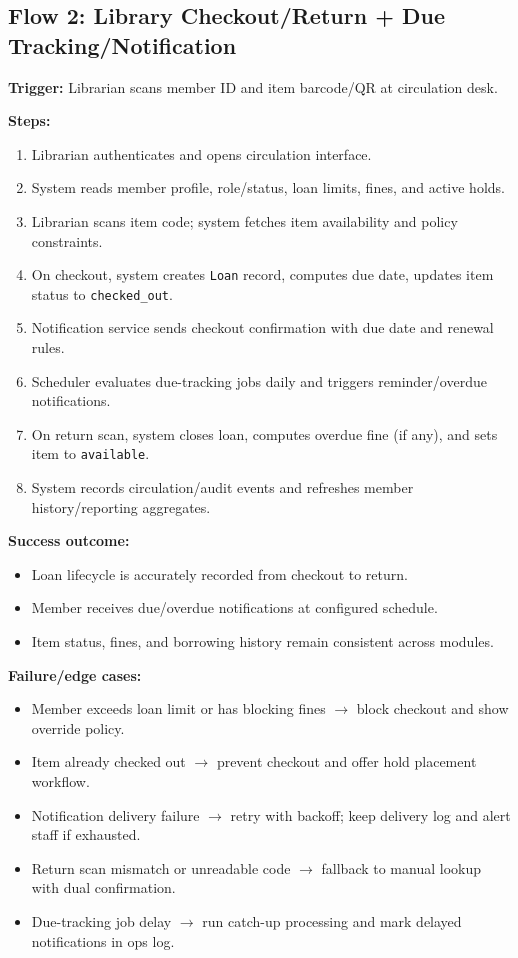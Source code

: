 \documentclass[12pt,a4paper]{article}
\begin{document}
\subsection*{Flow 2: Library Checkout/Return + Due Tracking/Notification}
\textbf{Trigger:} Librarian scans member ID and item barcode/QR at circulation desk.

\textbf{Steps:}
\begin{enumerate}
    \item Librarian authenticates and opens circulation interface.
    \item System reads member profile, role/status, loan limits, fines, and active holds.
    \item Librarian scans item code; system fetches item availability and policy constraints.
    \item On checkout, system creates \texttt{Loan} record, computes due date, updates item status to \texttt{checked\_out}.
    \item Notification service sends checkout confirmation with due date and renewal rules.
    \item Scheduler evaluates due-tracking jobs daily and triggers reminder/overdue notifications.
    \item On return scan, system closes loan, computes overdue fine (if any), and sets item to \texttt{available}.
    \item System records circulation/audit events and refreshes member history/reporting aggregates.
\end{enumerate}

\textbf{Success outcome:}
\begin{itemize}
    \item Loan lifecycle is accurately recorded from checkout to return.
    \item Member receives due/overdue notifications at configured schedule.
    \item Item status, fines, and borrowing history remain consistent across modules.
\end{itemize}

\textbf{Failure/edge cases:}
\begin{itemize}
    \item Member exceeds loan limit or has blocking fines $\rightarrow$ block checkout and show override policy.
    \item Item already checked out $\rightarrow$ prevent checkout and offer hold placement workflow.
    \item Notification delivery failure $\rightarrow$ retry with backoff; keep delivery log and alert staff if exhausted.
    \item Return scan mismatch or unreadable code $\rightarrow$ fallback to manual lookup with dual confirmation.
    \item Due-tracking job delay $\rightarrow$ run catch-up processing and mark delayed notifications in ops log.
\end{itemize}
\end{document}
